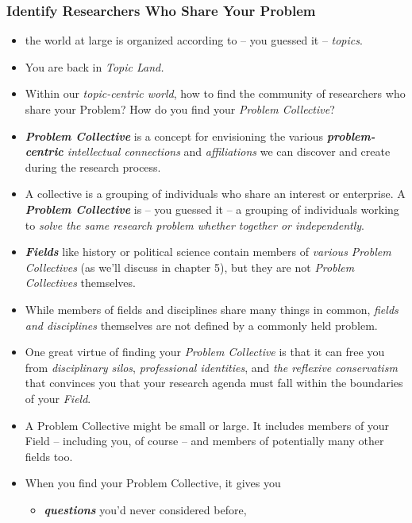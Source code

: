 \documentclass[11pt]{article}
\begin{document}
\subsubsection{Identify Researchers Who Share Your Problem}
\begin{itemize}
\item the world at large is organized according to -- you guessed it -- \emph{topics}.

\item You are back in \emph{Topic Land.}

\item Within our \emph{topic-centric world}, how to find the community of researchers who share your Problem? How do you find your \emph{Problem Collective}?

\item \emph{\textbf{Problem Collective}} is a concept for envisioning the various \emph{\textbf{problem-centric} intellectual connections} and \emph{affiliations} we can discover and create during the research process.

\item A collective is a grouping of individuals who share an interest or enterprise. A \emph{\textbf{Problem Collective}} is -- you guessed it -- a grouping of individuals working to \emph{solve the same research problem whether together or independently}.

\item \emph{\textbf{Fields}} like history or political science contain members of \emph{various Problem Collectives} (as we’ll discuss in chapter 5), but they are not \emph{Problem Collectives} themselves. 

\item While members of fields and disciplines share many things in common, \emph{fields and disciplines} themselves are not defined by a commonly held problem.

\item One great virtue of finding your \emph{Problem Collective} is that it can free you from \emph{disciplinary silos}, \emph{professional identities}, and \emph{the reflexive conservatism} that convinces you that your research agenda must fall within the boundaries of your \emph{Field}.

\item A Problem Collective might be small or large. It includes members of your Field -- including you, of course -- and members of potentially many other fields too. 

\item When you find your Problem Collective, it gives you
\begin{itemize}
\item \emph{\textbf{questions}} you’d never considered before,


\end{itemize}
\end{itemize}
\end{document}
